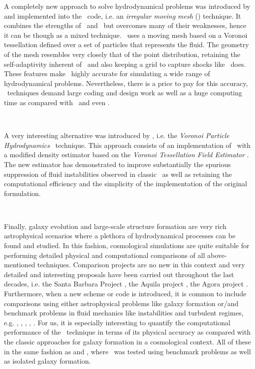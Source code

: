 \documentclass[a4,useAMS,usenatbib,usegraphicx,12pt]{article}
\begin{document}
A completely new approach to solve hydrodynamical problems was introduced by 
\citet{Springel10} and implemented into the \AREPO\ code, i.e. an \textit{
irregular moving mesh} (\IMM) technique. It combines the strengths of \AMR\ and 
\SPH\ but overcomes many of their weaknesses, hence it can be though as a mixed 
technique. \AREPO\ uses a moving mesh based on a Voronoi tessellation defined 
over a set of particles that represents the fluid. The geometry of the mesh 
resembles very closely that of the point distribution, retaining the 
self-adaptivity inherent of \SPH\ and also keeping a grid to capture shocks 
like \AMR\ does. These features make \AREPO\ highly accurate for simulating a 
wide range of hydrodynamical problems. Nevertheless, there is a price to pay 
for this accuracy, \IMM\ techniques demand large coding and design work as well
as a huge computing time as compared with \SPH\ and even \AMR.

\

A very interesting alternative was introduced by \citet{Hess10}, i.e. the 
\textit{Voronoi Particle Hydrodynamics} \VPH\ technique. This approach consists
of an implementation of \SPH\ with a modified density estimator based on the  
\textit{Voronoi Tessellation Field Estimator} \VTFE. The new estimator
has demonstrated to improve substantially the spurious suppression of fluid 
instabilities observed in classic \SPH\ as well as retaining the computational 
efficiency and the simplicity of the implementation of the original formulation.

\

Finally, galaxy evolution and large-scale structure formation are very rich 
astrophysical scenarios where a plethora of hydrodynamical processes can be 
found and studied. In this fashion, cosmological simulations are quite suitable 
for performing detailed physical and computational comparisons of all 
above-mentioned techniques. Comparison projects are no new in this context 
and very detailed and interesting proposals have been carried out throughout
the last decades, i.e. the Santa Barbara Project \citep{Frenk99}, the Aquila
project \citep{Scannapieco12}, the Agora project \citep{Kim14}. Furthermore,
when a new scheme or code is introduced, it is common to include comparisons 
using either astrophysical problems like galaxy formation or/and benchmark 
problems in fluid mechanics like instabilities and turbulent regimes, e.g.
\citep{Berger89}, \citep{Teyssier02}, \citep{Springel05}, \citep{Springel10}, 
\citep{Hess10}. For us, it is especially interesting to quantify the 
computational performance of the \VPH\ technique in terms of its physical 
accuracy as compared with the classic approaches for galaxy formation in a
cosmological context. All of these in the same fashion as \citet{Hess10} and 
\citet{Hess12}, where \VPH\ was tested using benchmark problems as well as
isolated galaxy formation.
\end{document}

